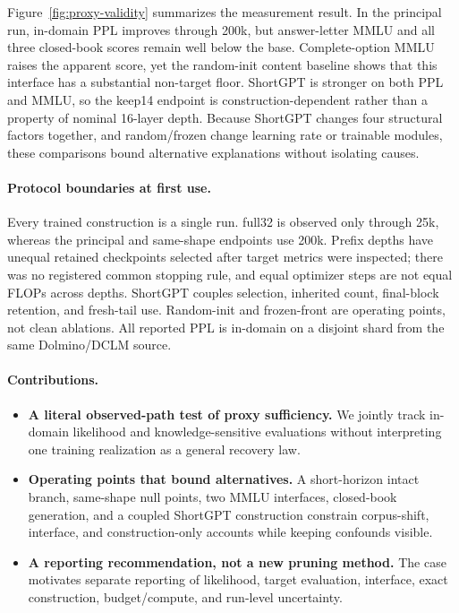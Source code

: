 Figure~\ref{fig:proxy-validity} summarizes the measurement result. In the
principal run, in-domain PPL improves through 200k, but answer-letter MMLU and
all three closed-book scores remain well below the base. Complete-option MMLU
raises the apparent score, yet the random-init content baseline shows that this
interface has a substantial non-target floor. ShortGPT is stronger on both PPL
and MMLU, so the keep14 endpoint is construction-dependent rather than a
property of nominal 16-layer depth. Because ShortGPT changes four structural
factors together, and random/frozen change learning rate or trainable modules,
these comparisons bound alternative explanations without isolating causes.

\paragraph{Protocol boundaries at first use.}
Every trained construction is a single run. full32 is observed only through
25k, whereas the principal and same-shape endpoints use 200k. Prefix depths
have unequal retained checkpoints selected after target metrics were inspected;
there was no registered common stopping rule, and equal optimizer steps are not
equal FLOPs across depths. ShortGPT couples selection, inherited count,
final-block retention, and fresh-tail use. Random-init and frozen-front are
operating points, not clean ablations. All reported PPL is in-domain on a
disjoint shard from the same Dolmino/DCLM source.

\paragraph{Contributions.}
\begin{itemize}[leftmargin=1.2em,itemsep=2pt]
\item \textbf{A literal observed-path test of proxy sufficiency.} We jointly
track in-domain likelihood and knowledge-sensitive evaluations without
interpreting one training realization as a general recovery law.
\item \textbf{Operating points that bound alternatives.} A short-horizon intact
branch, same-shape null points, two MMLU interfaces, closed-book generation, and
a coupled ShortGPT construction constrain corpus-shift, interface, and
construction-only accounts while keeping confounds visible.
\item \textbf{A reporting recommendation, not a new pruning method.} The case
motivates separate reporting of likelihood, target evaluation, interface,
exact construction, budget/compute, and run-level uncertainty.
\end{itemize}
